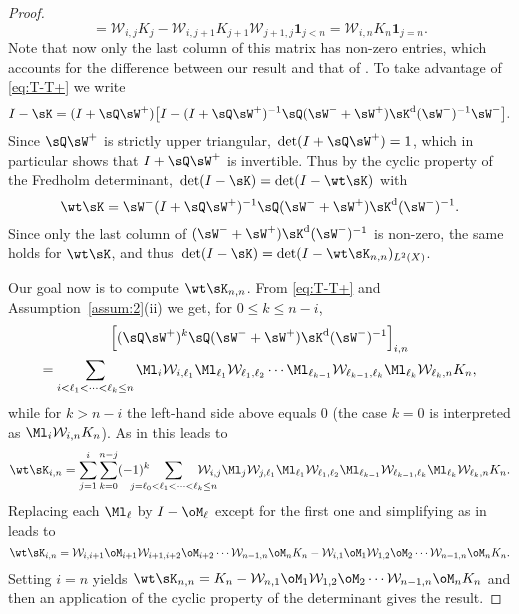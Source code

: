 \documentclass[]{pcmi}
\theoremstyle{plain}
\theoremstyle{definition}
\newcommand{\uno}[1]{\mathbf{1}_{#1}}
\begin{document}
\begin{proof}
\begin{equation}
      =\mathcal{W}_{i,j}K_{j}-\mathcal{W}_{i,{j+1}}K_{j+1}\mathcal{W}_{{j+1},j}\uno{j<n}
      =\mathcal{W}_{{i},{n}}K_{n}\uno{j=n}.\label{eq:T-T+}
  \end{equation}
  Note that now only the last column of this matrix has non-zero entries, which accounts for the difference between our result and that of \cite{bcr}. 
  To take advantage of \eqref{eq:T-T+} we write 
  \[
  I-\sK=(I+\sQ\sW^+)\big[I-(I+\sQ\sW^+)^{-1}\sQ(\sW^-+\sW^+)\sK^{\rm d}(\sW^-)^{-1}\sW^-\big].
  \]
  Since $\sQ\sW^+$ is strictly upper triangular, $\,\det(I+\sQ\sW^+)=1$, which in particular shows that $I+\sQ\sW^+$ is invertible. Thus by the cyclic property of the Fredholm determinant, $\,\det(I-\sK)=\det(I-\wt\sK)$ with
  \[\wt\sK=\sW^-(I+\sQ\sW^+)^{-1}\sQ(\sW^-+\sW^+)\sK^{\rm d}(\sW^-)^{-1}.\]
  Since only the last column of $(\sW^-+\sW^+)\sK^{\rm d}(\sW^-)^{-1}$ is non-zero, the same holds for $\wt\sK$, and thus $\,\det(I-\sK)=\det(I-\wt\sK_{n,n})_{L^2(X)}$.

  Our goal now is to compute $\wt\sK_{n,n}$.
  From \eqref{eq:T-T+} and Assumption~\ref{assum:2}(ii) we get, for $0\leq k\leq n-i$,
  \begin{multline*}
    \left[(\sQ\sW^+)^k\sQ(\sW^-+\sW^+)\sK^{\rm d}(\sW^-)^{-1}\right]_{i,n}\\
    =\qquad\smashoperator{\sum_{i<\ell_1<\dots<\ell_k\leq n}}\qquad
    \Ml_{{i}}\mathcal{W}_{i,{\ell_1}}\Ml_{{\ell_1}}\mathcal{W}_{{\ell_{1}},{\ell_2}} \dotsm
    \Ml_{{\ell_{k-1}}}\mathcal{W}_{{\ell_{k-1}},{\ell_k}}\Ml_{{\ell_k}}\mathcal{W}_{{\ell_k},{n}}K_{n},
  \end{multline*}
  while for $k>n-i$ the left-hand side above equals 0 (the case $k=0$ is interpreted as
  $\Ml_{i}\mathcal{W}_{i,n}K_{n}$). 
  As in \cite{bcr} this leads to
  \begin{equation}
    \wt\sK_{i,n}
    =\sum_{j=1}^i\sum_{k=0}^{n-j}(-1)^{k}\quad\smashoperator{\sum_{j=\ell_0<\ell_1<\dots<\ell_k\leq
        n}}\quad\mathcal{W}_{i,j}\Ml_{j}\mathcal{W}_{{j},{{\ell_1}}}\Ml_{{\ell_1}}\mathcal{W}_{{\ell_1},{\ell_2}}
    \Ml_{{\ell_{k-1}}}\mathcal{W}_{{\ell_{k-1}},{\ell_k}}\Ml_{{\ell_k}}\mathcal{W}_{{\ell_k},{n}}K_{n}.
  \end{equation}
  Replacing each $\Ml_{\ell}$ by $I-\oM_{\ell}$ except for the first one and simplifying as in \cite{bcr} leads to
  \[\wt\sK_{i,n}=\mathcal{W}_{{i},{i+1}}\oM_{{i+1}}\mathcal{W}_{{i+1},{i+2}}\oM_{{i+2}}
    \dotsm\mathcal{W}_{{{n-1}},{{n}}}\oM_{{{n}}}K_{n}-\mathcal{W}_{{i},{1}}\oM_{{1}}\mathcal{W}_{{1},{2}}\oM_{{2}}\dotsm\mathcal{W}_{{{n-1}},{{n}}}\oM_{{{n}}}K_{n}.\]
  Setting $i=n$ yields $\wt\sK_{n,n}=K_{n}-\mathcal{W}_{{n},{1}}\oM_{{1}}\mathcal{W}_{{1},{2}}\oM_{{2}}\dotsm\mathcal{W}_{{{n-1}},{{n}}}\oM_{{{n}}}K_{n}$
  and then an application of the cyclic property of the determinant gives the result.
\end{proof}
\end{document}
